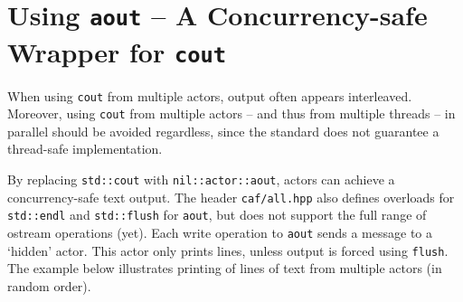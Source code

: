 \section{Using \texttt{aout} -- A Concurrency-safe Wrapper for \texttt{cout}}

When using \lstinline^cout^ from multiple actors, output often appears
interleaved. Moreover, using \lstinline^cout^ from multiple actors -- and thus
from multiple threads -- in parallel should be avoided regardless, since the
standard does not guarantee a thread-safe implementation.

By replacing \texttt{std::cout} with \texttt{nil::actor::aout}, actors can achieve a
concurrency-safe text output. The header \lstinline^caf/all.hpp^ also defines
overloads for \texttt{std::endl} and \texttt{std::flush} for \lstinline^aout^,
but does not support the full range of ostream operations (yet). Each write
operation to \texttt{aout} sends a message to a `hidden' actor. This actor only
prints lines, unless output is forced using \lstinline^flush^. The example
below illustrates printing of lines of text from multiple actors (in random
order).

